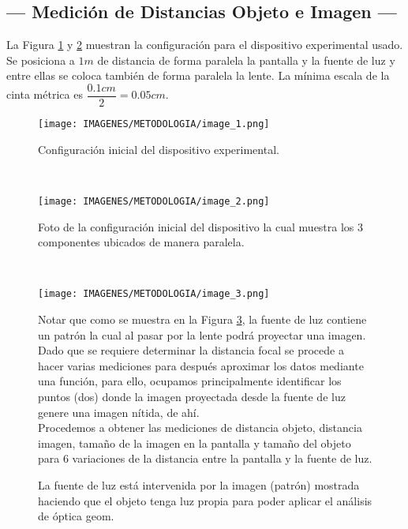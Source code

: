\documentclass[10pt,a4paper]{article}
\begin{document}
\subsection{--- Medición de Distancias Objeto e Imagen ---} %
\label{sub:dist_obj_img}
La Figura \ref{fig:ima_1} y \ref{fig:ima_2} muestran la configuración para el dispositivo experimental usado. Se posiciona a \(1m\) de distancia de forma paralela la pantalla y la fuente de luz y entre ellas se coloca también de forma paralela la lente.
La mínima escala de la cinta métrica es $\dfrac{0.1 cm}{2}=0.05 cm$.
\begin{figure}[ht]
	\centering
	\texttt{[image: IMAGENES/METODOLOGIA/image\_1.png]}
	\caption{Configuración inicial del dispositivo experimental.}
	\label{fig:ima_1}
\end{figure}\\[-5mm]
\begin{figure}[ht]
	\centering
	\texttt{[image: IMAGENES/METODOLOGIA/image\_2.png]}
	\caption{Foto de la configuración inicial del dispositivo la cual muestra los 3 componentes ubicados de manera paralela.}
	\label{fig:ima_2}
\end{figure}\\[-3mm]
\begin{figure}[ht]
	\begin{minipage}{0.3\linewidth}
		\centering
		\texttt{[image: IMAGENES/METODOLOGIA/image\_3.png]}
		\caption{\small La fuente de luz está intervenida por la imagen (patrón) mostrada haciendo que el objeto tenga luz propia para poder aplicar el análisis de óptica geom.}
		\label{fig:inversion}
	\end{minipage}\hspace{1cm}
	\begin{minipage}{0.5\linewidth}
		Notar que como se muestra en la Figura \ref{fig:inversion}, la fuente de luz contiene un patrón la cual al pasar por la lente podrá proyectar una imagen. \\[7mm]
		Dado que se requiere determinar la distancia focal se procede a hacer varias mediciones para después aproximar los datos mediante una función, para ello, ocupamos principalmente identificar los puntos (dos) donde la imagen proyectada desde la fuente de luz genere una imagen nítida, de ahí. \\[7mm] 
		Procedemos a obtener las mediciones de distancia objeto, distancia imagen, tamaño de la imagen en la pantalla y tamaño del objeto para 6 variaciones de la distancia entre la pantalla y la fuente de luz.
	\end{minipage}
\end{figure}
\end{document}

